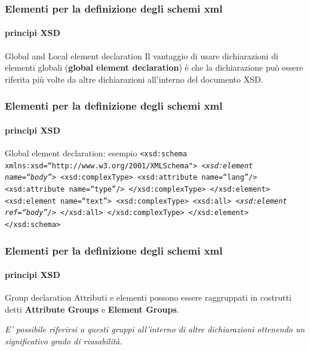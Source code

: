 
\begin{frame}
	\frametitle{Elementi per la definizione degli schemi xml}
	\framesubtitle{principi XSD}
	\addtocounter{nframe}{1}

	\begin{block}{Global and Local element declaration}
		Il vantaggio di usare dichiarazioni di elementi globali (\textbf{global element declaration})
		è che la dichiarazione può essere riferita più volte da altre dichiarazioni all'interno del documento XSD.
	\end{block}

\end{frame}


\begin{frame}
	\frametitle{Elementi per la definizione degli schemi xml}
	\framesubtitle{principi XSD}
	\addtocounter{nframe}{1}

	\begin{block}{Global element declaration: esempio}
		\texttt{<xsd:schema xmlns:xsd=``http://www.w3.org/2001/XMLSchema">
			\emph{<xsd:element name=``body''>}
			<xsd:complexType>
			<xsd:attribute name=``lang''/>
			<xsd:attribute name=``type''/>
			</xsd:complexType>
			</xsd:element>
			<xsd:element name=``text''>
			<xsd:complexType>
			<xsd:all>
			\emph{<xsd:element ref=``body''/>}
			</xsd:all>
			</xsd:complexType>
			</xsd:element>
			</xsd:schema>}
	\end{block}

\end{frame}


\begin{frame}
	\frametitle{Elementi per la definizione degli schemi xml}
	\framesubtitle{principi XSD}
	\addtocounter{nframe}{1}

	\begin{block}{Group declaration}
		Attributi e elementi possono essere raggruppati in costrutti detti \textbf{Attribute Groups} e \textbf{Element Groups}.
	\end{block}
	
	\textit{E' possibile riferirsi a questi gruppi all'interno di altre dichiarazioni ottenendo un significativo grado di riusabilità.}

\end{frame}


